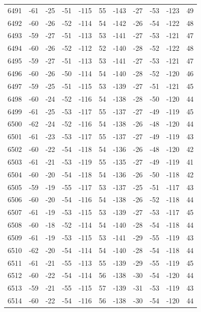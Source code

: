 \begin{table}[H]
\begin{tabular}{lllllllllll}
6491 & -61 & -25 & -51 & -115 & 55 & -143 & -27 & -53 & -123 & 49 \\
6492 & -60 & -26 & -52 & -114 & 54 & -142 & -26 & -54 & -122 & 48 \\
6493 & -59 & -27 & -51 & -113 & 53 & -141 & -27 & -53 & -121 & 47 \\
6494 & -60 & -26 & -52 & -112 & 52 & -140 & -28 & -52 & -122 & 48 \\
6495 & -59 & -27 & -51 & -113 & 53 & -141 & -27 & -53 & -121 & 47 \\
6496 & -60 & -26 & -50 & -114 & 54 & -140 & -28 & -52 & -120 & 46 \\
6497 & -59 & -25 & -51 & -115 & 53 & -139 & -27 & -51 & -121 & 45 \\
6498 & -60 & -24 & -52 & -116 & 54 & -138 & -28 & -50 & -120 & 44 \\
6499 & -61 & -25 & -53 & -117 & 55 & -137 & -27 & -49 & -119 & 45 \\
6500 & -62 & -24 & -52 & -116 & 54 & -138 & -26 & -48 & -120 & 44 \\
6501 & -61 & -23 & -53 & -117 & 55 & -137 & -27 & -49 & -119 & 43 \\
6502 & -60 & -22 & -54 & -118 & 54 & -136 & -26 & -48 & -120 & 42 \\
6503 & -61 & -21 & -53 & -119 & 55 & -135 & -27 & -49 & -119 & 41 \\
6504 & -60 & -20 & -54 & -118 & 54 & -136 & -26 & -50 & -118 & 42 \\
6505 & -59 & -19 & -55 & -117 & 53 & -137 & -25 & -51 & -117 & 43 \\
6506 & -60 & -20 & -54 & -116 & 54 & -138 & -26 & -52 & -118 & 44 \\
6507 & -61 & -19 & -53 & -115 & 53 & -139 & -27 & -53 & -117 & 45 \\
6508 & -60 & -18 & -52 & -114 & 54 & -140 & -28 & -54 & -118 & 44 \\
6509 & -61 & -19 & -53 & -115 & 53 & -141 & -29 & -55 & -119 & 43 \\
6510 & -62 & -20 & -54 & -114 & 54 & -140 & -28 & -54 & -118 & 44 \\
6511 & -61 & -21 & -55 & -113 & 55 & -139 & -29 & -55 & -119 & 45 \\
6512 & -60 & -22 & -54 & -114 & 56 & -138 & -30 & -54 & -120 & 44 \\
6513 & -59 & -21 & -55 & -115 & 57 & -139 & -31 & -53 & -119 & 43 \\
6514 & -60 & -22 & -54 & -116 & 56 & -138 & -30 & -54 & -120 & 44 \\

\end{tabular}
\end{table}
